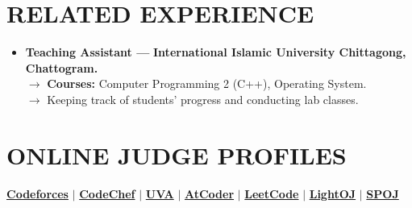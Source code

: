 \documentclass[a4paper,10pt]{article}
\begin{document}
	
	
	\section*{RELATED EXPERIENCE}
	\begin{itemize}[left=0pt]
		\item \textbf{Teaching Assistant — }
		\textbf{International Islamic University Chittagong, Chattogram.}\\
		$\rightarrow${ \textbf{Courses:} Computer Programming 2 (C++), Operating System.}\\
		$\rightarrow${ Keeping track of students' progress and conducting lab classes.}
	\end{itemize}
	
	
	
	\section*{ONLINE JUDGE PROFILES}
	\textbf {\href{https://codeforces.com/profile/sabrina_mostafa}{Codeforces}} \: $|$ \:
	\textbf{\href{https://www.codechef.com/users/sabrina_001}{CodeChef}} \: $|$ \:
	\textbf{\href{https://onlinejudge.org/index.php?option=com_comprofiler&Itemid=3}{UVA}} \: $|$ \: 
	\textbf {\href{https://atcoder.jp/users/sabrina_mostafa}{AtCoder}} \: $|$ \:
	\textbf {\href{https://leetcode.com/sabrina_mostafa/}{LeetCode}} \: $|$ \:
	\textbf{\href{https://lightoj.com/user/sabrina_mostafa}{LightOJ}} \: $|$ \:
	\textbf{\href{https://www.spoj.com/status/sabrina_001/}{SPOJ}}
	
		
	
\end{document}
